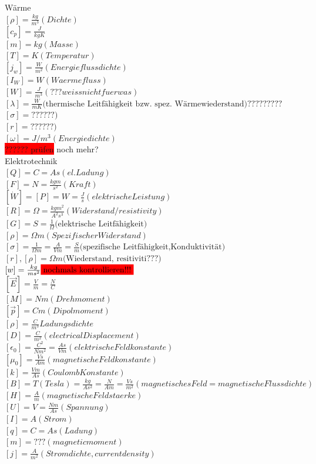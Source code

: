 \documentclass[a4paper]{scrartcl}
\begin{document}
Wärme\\
$ [\rho]=\frac{kg}{m^3} (Dichte)$\\
$ [c_p]=\frac{J}{kgK} $\\
$ [m]=kg (Masse)$\\
$ [T]=K (Temperatur)$\\
$ [j_w]=\frac{W}{m^2} (Energieflussdichte)$\\
$ [I_W]=W (Waermefluss)$\\
$ [W]=\frac{J}{m^3} (???weiss nicht fuer was)$\\
$ [ \lambda ] = \frac{W}{mK} \text{(thermische Leitfähigkeit bzw. spez.  Wärmewiederstand)}????????? $\\
$ [ \sigma ]=??? ???)$\\
$ [ r ]=??? ???)$\\
$ [\omega] = J/m^3 (Energiedichte)$ \\
\colorbox{red}{?????? prüfen} noch mehr? \\

Elektrotechnik\\
$ [Q]=C=As (el. Ladung)$\\
$ [F]=N=\frac{kg m}{s^2} (Kraft)$\\
$ [\dot W]=[P]=W=\frac{J}{s} (elektrische Leistung)$\\
$ [R] = \Omega = \frac{kg m^2}{A^2 s^3} (Widerstand/resistivity) $\\
$ [G] = S = \frac{1}{\Omega} \text{(elektrische Leitfähigkeit)}$\\
$ [\rho] = \Omega m (Spezifischer Widerstand)$\\
$ [\sigma] = \frac{1}{\Omega m} = \frac{A}{Vm} = \frac{S}{m} \text{(spezifische Leitfähigkeit,Konduktivität)} $\\
$ [r] , [\rho]= \Omega m \text{(Wiederstand, resitiviti???)} $\\
$ [w]=\frac{kg}{ms^2} \colorbox{red}{nochmals kontrollieren!!!} $\\
$ [\vec E]=\frac{V}{m} = \frac{N}{C}$\\
$ [M]=Nm (Drehmoment)$\\
$ [\vec p]=Cm (Dipolmoment)$\\
$ [\rho]=\frac{C}{m^3} Ladungsdichte$\\
$ [D]=\frac{C}{m^2} (electrical Displacement)$\\
$ [\epsilon_0]= \frac{C^2}{Nm^2}=\frac{As}{Vm} (elektrische Feldkonstante)$\\
$ [\mu_0] = \frac{Vs}{Am} (magnetische Feldkonstante)$\\
$ [k] = \frac{Vm}{As} (Coulomb Konstante)$\\
$ [B]= T (Tesla) = \frac{kg}{As^2} = \frac{N}{Am} = \frac{Vs}{m^2} (magnetisches
Feld = magnetische Flussdichte)$\\
$ [H]= \frac{A}{m} (magnetische Feldstaerke)$\\
$ [U]= V = \frac{Nm}{As} (Spannung) $\\
$ [I]= A (Strom) $\\
$ [q]= C = As (Ladung)$\\
$ [m]= ??? (magnetic moment)$\\
$ [j]= \frac{A}{m^2} (Stromdichte, current density)$\\
\end{document}
